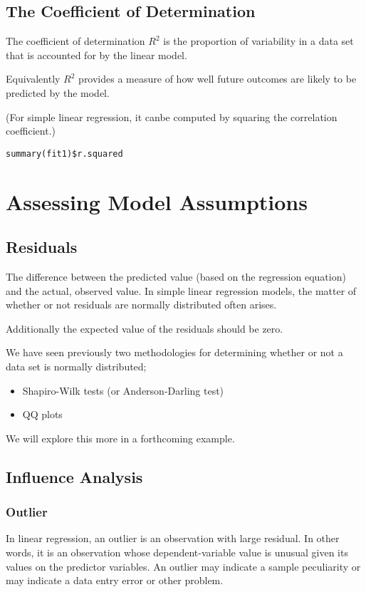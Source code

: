 \documentclass[a4paper,12pt]{article}
\begin{document}
\subsection{The Coefficient of Determination}
The coefficient of determination $R^2$ is the proportion of variability in a data set that is accounted for by the linear model.

Equivalently $R^2$ provides a measure of how well future outcomes are likely to be predicted by the model.

(For simple linear regression, it canbe computed by squaring the correlation coefficient.)

\begin{framed}
\begin{verbatim}
summary(fit1)$r.squared
\end{verbatim}
\end{framed}
\newpage
\section{Assessing Model Assumptions}
\subsection{Residuals}  The difference between the predicted value (based on the regression equation) and the actual, observed value. In simple linear regression models, the matter of whether or not residuals are normally distributed often arises.

Additionally the expected value of the residuals should be zero.

We have seen previously two methodologies for determining whether or not a data set is normally distributed;

\begin{itemize} \item 	Shapiro-Wilk tests (or Anderson-Darling test)
\item 	QQ plots
\end{itemize}

We will explore this more in a forthcoming example.
\subsection{Influence Analysis}


\subsubsection{Outlier} In linear regression, an outlier is an observation with large residual.  In other words, it is an observation whose dependent-variable value is unusual given its values on the predictor variables.  An outlier may indicate a sample peculiarity or may indicate a data entry error or other problem.
\end{document}
